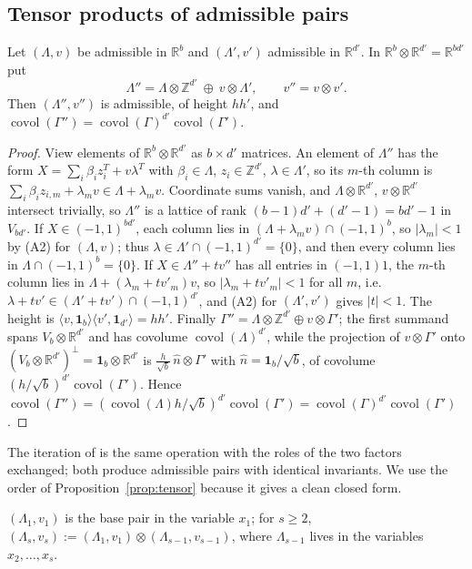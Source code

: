\documentclass[12pt]{article}
\newcommand{\Z}{\mathbb{Z}}
\newcommand{\R}{\mathbb{R}}
\newcommand{\covol}{\operatorname{covol}}
\newcommand{\one}{\mathbf{1}}
\newcommand{\dcube}[1]{(-#1,#1)}
\newcommand{\Lat}{\Lambda}
\begin{document}
\subsection{Tensor products of admissible pairs}
\begin{proposition}\label{prop:tensor}
Let $(\Lat,v)$ be admissible in $\R^{b}$ and $(\Lat',v')$ admissible in $\R^{d'}$. In $\R^b\otimes\R^{d'}=\R^{bd'}$ put
\[
\Lat''=\Lat\otimes\Z^{d'}\ \oplus\ v\otimes\Lat',\qquad v''=v\otimes v'.
\]
Then $(\Lat'',v'')$ is admissible, of height $hh'$, and $\covol(\Gamma'')=\covol(\Gamma)^{d'}\covol(\Gamma')$.
\end{proposition}
\begin{proof}
View elements of $\R^b\otimes\R^{d'}$ as $b\times d'$ matrices. An element of $\Lat''$ has the form
$X=\sum_i\beta_iz_i^{T}+v\lambda^{T}$ with $\beta_i\in\Lat$, $z_i\in\Z^{d'}$, $\lambda\in\Lat'$, so its $m$-th column is
$\sum_i\beta_iz_{i,m}+\lambda_mv\in\Lat+\lambda_mv$. Coordinate sums vanish, and $\Lat\otimes\R^{d'}$, $v\otimes\R^{d'}$
intersect trivially, so $\Lat''$ is a lattice of rank $(b-1)d'+(d'-1)=bd'-1$ in $V_{bd'}$.
If $X\in\dcube1^{bd'}$, each column lies in $(\Lat+\lambda_mv)\cap\dcube1^b$, so $|\lambda_m|<1$ by (A2) for $(\Lat,v)$;
thus $\lambda\in\Lat'\cap\dcube1^{d'}=\{0\}$, and then every column lies in $\Lat\cap\dcube1^b=\{0\}$.
If $X\in\Lat''+tv''$ has all entries in $\dcube11$, the $m$-th column lies in $\Lat+(\lambda_m+tv'_m)v$, so
$|\lambda_m+tv'_m|<1$ for all $m$, i.e.\ $\lambda+tv'\in(\Lat'+tv')\cap\dcube1^{d'}$, and (A2) for $(\Lat',v')$ gives
$|t|<1$. The height is $\langle v,\one_b\rangle\langle v',\one_{d'}\rangle=hh'$. Finally
$\Gamma''=\Lat\otimes\Z^{d'}\oplus v\otimes\Gamma'$; the first summand spans $V_b\otimes\R^{d'}$ and has covolume
$\covol(\Lat)^{d'}$, while the projection of $v\otimes\Gamma'$ onto $(V_b\otimes\R^{d'})^\perp=\one_b\otimes\R^{d'}$ is
$\frac{h}{\sqrt b}\,\hat n\otimes\Gamma'$ with $\hat n=\one_b/\sqrt b$, of covolume $(h/\sqrt b)^{d'}\covol(\Gamma')$.
Hence $\covol(\Gamma'')=(\covol(\Lat)h/\sqrt b)^{d'}\covol(\Gamma')=\covol(\Gamma)^{d'}\covol(\Gamma')$.
\end{proof}

The iteration of \cite{EP1} is the same operation with the roles of the two factors exchanged; both produce admissible
pairs with identical invariants. We use the order of Proposition~\ref{prop:tensor} because it gives a clean closed form.

\begin{definition}
$(\Lat_1,v_1)$ is the base pair in the variable $x_1$; for $s\ge2$,
$(\Lat_s,v_s):=(\Lat_1,v_1)\otimes(\Lat_{s-1},v_{s-1})$, where $\Lat_{s-1}$ lives in the variables $x_2,\dots,x_s$.
\end{definition}
\end{document}
